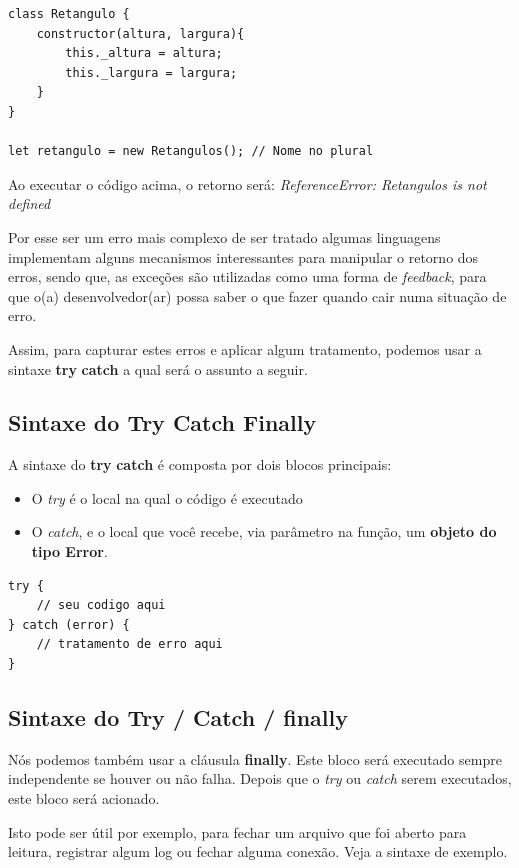 \begin{verbatim}
class Retangulo { 
	constructor(altura, largura){
		this._altura = altura;
		this._largura = largura;
	}	
}

let retangulo = new Retangulos(); // Nome no plural
\end{verbatim}

Ao executar o código acima, o retorno será: \textit{ReferenceError: Retangulos is not defined}

Por esse ser um erro mais complexo de ser tratado algumas linguagens implementam alguns mecanismos interessantes para manipular o retorno dos erros, sendo que, as exceções são utilizadas como uma forma de \textit{feedback}, para que o(a) desenvolvedor(ar) possa saber o que fazer quando cair numa situação de erro. 

Assim, para capturar estes erros e aplicar algum tratamento, podemos usar a sintaxe \textbf{try} \textbf{catch} a qual será o assunto a seguir.

\subsection{Sintaxe do Try Catch Finally}

A sintaxe do \textbf{try} \textbf{catch} é composta por dois blocos principais:
\begin{itemize}
	\item O \textit{try} é o local na qual o código é executado 
	\item O \textit{catch}, e o local que você recebe, via parâmetro na função, um \textbf{objeto do tipo Error}. 
\end{itemize}

\begin{verbatim}
try {
	// seu codigo aqui
} catch (error) {
	// tratamento de erro aqui
}
\end{verbatim}

\subsection{Sintaxe do Try / Catch / finally}	
Nós podemos também usar a cláusula \textbf{finally}. Este bloco será executado sempre independente se houver ou não falha. Depois que o \textit{try} ou \textit{catch} serem executados, este bloco será acionado. 

Isto pode ser útil por exemplo, para fechar um arquivo que foi aberto para leitura, registrar algum log ou fechar alguma conexão. Veja a sintaxe de exemplo.

